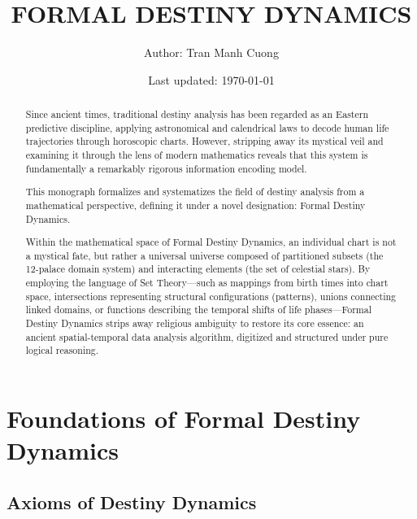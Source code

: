\documentclass[a4paper,14pt, twoside]{memoir}
\title{\MakeUppercase{Formal Destiny Dynamics}}
\author{Author: Tran Manh Cuong}
\date{Last updated: \today}
\begin{document}
\maketitle
\newpage
\begin{abstract}
	Since ancient times, traditional destiny analysis has been regarded as an Eastern predictive discipline, applying astronomical and calendrical laws to decode human life trajectories through horoscopic charts. However, stripping away its mystical veil and examining it through the lens of modern mathematics reveals that this system is fundamentally a remarkably rigorous information encoding model.

	This monograph formalizes and systematizes the field of destiny analysis from a mathematical perspective, defining it under a novel designation: {Formal Destiny Dynamics}.

	Within the mathematical space of Formal Destiny Dynamics, an individual chart is not a mystical fate, but rather a universal universe composed of partitioned subsets (the 12-palace domain system) and interacting elements (the set of celestial stars). By employing the language of Set Theory—such as mappings from birth times into chart space, intersections representing structural configurations (patterns), unions connecting linked domains, or functions describing the temporal shifts of life phases—Formal Destiny Dynamics strips away religious ambiguity to restore its core essence: an ancient spatial-temporal data analysis algorithm, digitized and structured under pure logical reasoning.
\end{abstract}
\tableofcontents
\chapter{Foundations of Formal Destiny Dynamics}
\section{Axioms of Destiny Dynamics}
\end{document}
